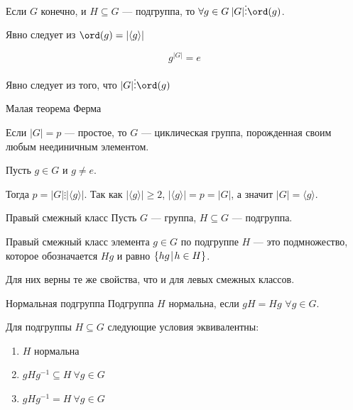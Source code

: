\begin{coroll}{}{}
    Если \( G \) конечно, и \( H \subseteq G \) --- подгруппа,
    то \( \forall g \in G \: |G| \vdots \ord(g) \).
\end{coroll}

Явно следует из \( \ord (g) = | \langle g \rangle | \)

\begin{coroll}{}{}
    \[
        g^{|G|} = e
    \]
\end{coroll}

Явно следует из того, что \( |G| \vdots \ord (g) \)

\begin{coroll}{}{}
    Малая теорема Ферма
\end{coroll}

\begin{coroll}{}{}
    Если \( |G| = p \) --- простое, то \( G \) --- циклическая группа,
    порожденная своим любым неединичным элементом.
\end{coroll}

Пусть \( g \in G \) и \( g \neq e \).

Тогда \( p = |G| \vdots | \langle g \rangle | \).
Так как \( | \langle g \rangle | \geq 2 \), \( | \langle g \rangle | = p = |G| \),
а значит \( |G| = \langle g \rangle \).

\begin{defn}{Правый смежный класс}{}
    Пусть \( G \) --- группа, \( H \subseteq G \) --- подгруппа.

    Правый смежный класс элемента \( g \in G \) по подгруппе \( H \) --- это подмножество,
    которое обозначается \( Hg \) и равно \( \{ hg \: \vline \: h \in H \} \).
\end{defn}

\begin{remark}{}{}
    Для них верны те же свойства, что и для левых смежных классов.
\end{remark}

\begin{defn}{Нормальная подгруппа}{}
    Подгруппа \( H \) нормальна, если \( gH = Hg \) \( \forall g \in G \).
\end{defn}

\begin{prop}{}{}
    Для подгруппы \( H \subseteq G \) следующие условия эквивалентны:
    \begin{enumerate}
        \item
            \( H \) нормальна
        \item
            \( gHg^{-1} \subseteq H \ \forall g \in G \)
        \item
            \( gHg^{-1} = H \ \forall g \in G \)
    \end{enumerate}
\end{prop}


